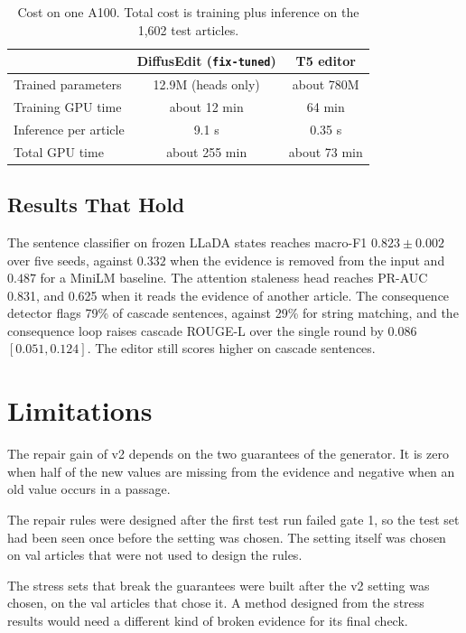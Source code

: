 \documentclass[]{paper}
\newcommand{\run}[1]{\texttt{#1}}
\begin{document}
\begin{table}[H]
\caption{Cost on one A100. Total cost is training plus inference on the 1,602 test articles.}
\label{tab:cost}
\centering
\footnotesize
\begin{tabular}{lcc}
\toprule
 & DiffusEdit (\run{fix-tuned}) & T5 editor \\
\midrule
Trained parameters & 12.9M (heads only) & about 780M \\
Training GPU time & about 12 min & 64 min \\
Inference per article & 9.1 s & 0.35 s \\
Total GPU time & about 255 min & about 73 min \\
\bottomrule
\end{tabular}
\end{table}

\subsection{Results That Hold}

The sentence classifier on frozen LLaDA states reaches macro-F1 $0.823 \pm 0.002$ over five seeds, against $0.332$ when the evidence is removed from the input and $0.487$ for a MiniLM baseline. The attention staleness head reaches PR-AUC 0.831, and 0.625 when it reads the evidence of another article. The consequence detector flags 79\% of cascade sentences, against 29\% for string matching, and the consequence loop raises cascade ROUGE-L over the single round by 0.086 $[0.051, 0.124]$. The editor still scores higher on cascade sentences.

\section{Limitations}
\label{sec:limits}

The repair gain of v2 depends on the two guarantees of the generator. It is zero when half of the new values are missing from the evidence and negative when an old value occurs in a passage.

The repair rules were designed after the first test run failed gate 1, so the test set had been seen once before the setting was chosen. The setting itself was chosen on val articles that were not used to design the rules.

The stress sets that break the guarantees were built after the v2 setting was chosen, on the val articles that chose it. A method designed from the stress results would need a different kind of broken evidence for its final check.
\end{document}
